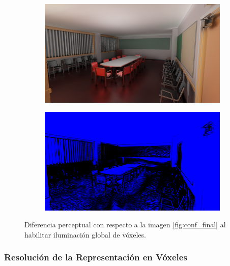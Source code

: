 \begin{figure}[H]
	\centering
	\begin{subfigure}[b]{.49\linewidth}
		\centering
		\captionsetup{justification=centering}
		\includegraphics[width=\linewidth]{media/finals/conf_vgi.png}
	\end{subfigure}%
	\hspace{0.01\textwidth}
	\begin{subfigure}[b]{.49\linewidth}
		\centering
		\captionsetup{justification=centering}
		\includegraphics[width=\linewidth]{media/finals/conf_vgi_diff.png}
	\end{subfigure}%
	\caption{Diferencia perceptual con respecto a la imagen \ref{fig:conf_final} al habilitar iluminación global de vóxeles.}
	\label{fig:conf_vgi_diff}
\end{figure}

\subsubsection{Resolución de la Representación en Vóxeles}

